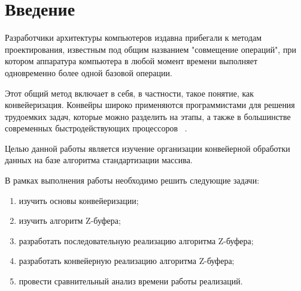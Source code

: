 \chapter*{Введение}

Разработчики архитектуры компьютеров издавна прибегали к методам проектирования, известным под общим названием "совмещение операций", при котором аппаратура компьютера в любой момент времени выполняет одновременно более одной базовой операции. 

Этот общий метод включает в себя, в частности, такое понятие, как конвейеризация. Конвейры широко применяются программистами для решения трудоемких задач, которые можно разделить на этапы, а также в большинстве современных быстродействующих процессоров ~\cite{first_article}. 


Целью данной работы является изучение организации конвейерной обработки данных на базе алгоритма стандартизации массива.


В рамках выполнения работы необходимо решить следующие задачи: 
\begin{enumerate}[label={\arabic*)}]
	\item изучить основы конвейеризации;
	\item изучить алгоритм Z-буфера;
	\item разработать последовательную реализацию алгоритма Z-буфера;
	\item разработать конвейерную реализацию алгоритма Z-буфера;
	\item провести сравнительный анализ времени работы реализаций.
\end{enumerate}